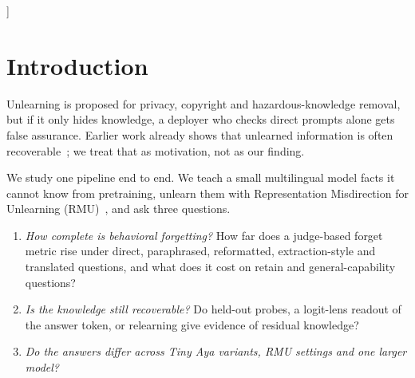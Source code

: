 \documentclass[10pt,twocolumn]{article}
\begin{document}
{\begin{abstract}
\noindent\emph{We do not claim erasure.} After 30 fine-tuning steps the RMU model recovers 5, 7 and 7 of 8 forgotten facts across Global seeds 42--44, against 4, 4 and 6 of 8 new facts on the same model and 7, 7 and 4 of 8 for an uninjected base. The gap is one to three facts, too small to call significant. Held-out probes separate forget from retain questions at AUROC 0.92--1.00 from layer 1 up (0.87--1.00 on Base), as does a never-injected base, so they reflect surface differences, not stored knowledge. On Global (seed 42), a teacher-forced logit lens shows RMU lowers but does not remove the first content token probability (0.971 to 0.696, n=40). We read the results as output-level suppression on the four instruction-tuned variants, with weak evidence of residual knowledge, and as a failure of the same settings on Base. On Aya Expanse 8B the same settings gave direct suppression of only 0.20 and cut judged retain accuracy from 0.91 to 0.67, so we claim no cross-model generality. Cohen's kappa is uninformative when labels are one-sided, even if the judges agree, so we report raw and prevalence-robust agreement. Small samples and three Global seeds limit every conclusion. We found no published paper on unlearning Tiny Aya.
\end{abstract}
\vspace{0.4em}
}]

\section{Introduction}
\label{sec:intro}
Unlearning is proposed for privacy, copyright and hazardous-knowledge removal, but if it only hides knowledge, a deployer who checks direct prompts alone gets false assurance. Earlier work already shows that unlearned information is often recoverable~\cite{hong2024conceptvectors,lucki2024adversarial,deeb2024unlearning}; we treat that as motivation, not as our finding.

We study one pipeline end to end. We teach a small multilingual model facts it cannot know from pretraining, unlearn them with Representation Misdirection for Unlearning (RMU)~\cite{li2024wmdp}, and ask three questions.
\begin{enumerate}[label=\textbf{RQ\arabic*.}]
  \item \emph{How complete is behavioral forgetting?} How far does a judge-based forget metric rise under direct, paraphrased, reformatted, extraction-style and translated questions, and what does it cost on retain and general-capability questions?
  \item \emph{Is the knowledge still recoverable?} Do held-out probes, a logit-lens readout of the answer token, or relearning give evidence of residual knowledge?
  \item \emph{Do the answers differ across Tiny Aya variants, RMU settings and one larger model?}
\end{enumerate}
\end{document}
